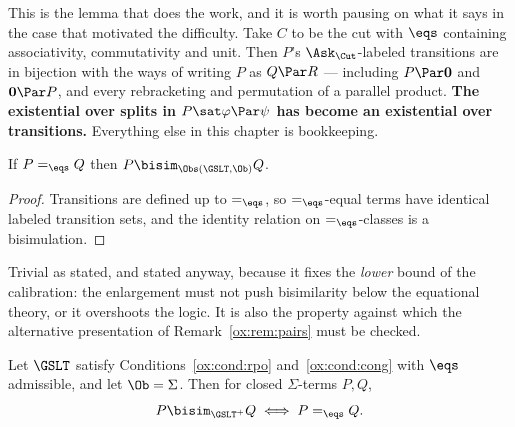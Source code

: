 This is the lemma that does the work, and it is worth pausing on what it says in
the case that motivated the difficulty. Take $C$ to be the cut with $\eqs$
containing associativity, commutativity and unit. Then $P$'s $\Ask_{\Cut}$-labeled
transitions are in bijection with the ways of writing $P$ as $Q \Par R$ ---
including $P \Par \mathbf{0}$ and $\mathbf{0} \Par P$, and every rebracketing and
permutation of a parallel product. \textbf{The existential over splits in
$P \sat \varphi \Par \psi$ has become an existential over transitions.} Everything
else in this chapter is bookkeeping.

\begin{lemma}[Calibration]
\label{ox:lem:calib}
If $P =_{\eqs} Q$ then $P \bisim_{\Obs(\GSLT,\Ob)} Q$.
\end{lemma}

\begin{proof}
Transitions are defined up to $=_{\eqs}$, so $=_{\eqs}$-equal terms have identical
labeled transition sets, and the identity relation on $=_{\eqs}$-classes is a
bisimulation.
\end{proof}

Trivial as stated, and stated anyway, because it fixes the \emph{lower} bound of
the calibration: the enlargement must not push bisimilarity below the equational
theory, or it overshoots the logic. It is also the property against which the
alternative presentation of Remark~\ref{ox:rem:pairs} must be checked.

\begin{theorem}[Reconstruction]
\label{ox:thm:main}
Let $\GSLT$ satisfy Conditions~\ref{ox:cond:rpo} and~\ref{ox:cond:cong} with
$\eqs$ admissible, and let $\Ob = \Sigma$. Then for closed $\Sigma$-terms $P,Q$,
\[
  P \bisim_{\GSLT^{+}} Q \iff P =_{\eqs} Q .
\]
\end{theorem}

